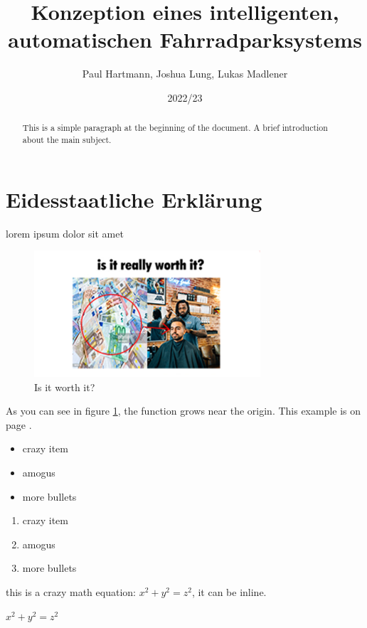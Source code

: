 \documentclass[a4paper]{article}
\title{Konzeption eines intelligenten, automatischen Fahrradparksystems}
\author{Paul Hartmann, Joshua Lung, Lukas Madlener}
\date{2022/23}
\begin{document}
\maketitle

\break



\section{Eidesstaatliche Erklärung}
lorem ipsum dolor sit amet


\begin{figure}[h]
  \centering
  \includegraphics[width=0.75\textwidth]{images/test}
  \caption{Is it worth it?}
  \label{fig:barber_cost}
\end{figure}

As you can see in figure \ref{fig:barber_cost}, the function grows near the origin. This example is on page \pageref{fig:barber_cost}.

\begin{itemize}
  \item crazy item
  \item amogus
  \item more bullets
\end{itemize}

\begin{enumerate}
  \item crazy item
  \item amogus
  \item more bullets
\end{enumerate}

this is a crazy math equation: $x^2 + y^2 = z^2$, it can be inline.

\begin{math}
  x^2 + y^2 = z^2
\end{math}


\begin{abstract}
  This is a simple paragraph at the beginning of the 
  document. A brief introduction about the main subject.
  \end{abstract}
\end{document}
